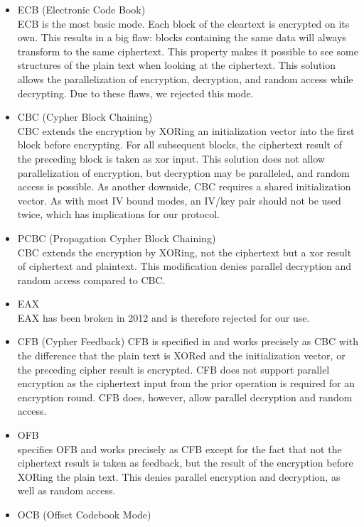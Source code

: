 \begin{itemize}
	\item ECB (Electronic Code Book)\\
	ECB is the most basic mode. Each block of the cleartext is encrypted on its own. This results in a big flaw: blocks containing the same data will always transform to the same ciphertext. This property makes it possible to see some structures of the plain text when looking at the ciphertext. This solution allows the parallelization of encryption, decryption, and random access while decrypting. Due to these flaws, we rejected this mode.
	\item CBC (Cypher Block Chaining)\\  
	CBC extends the encryption by XORing an initialization vector into the first block before encrypting. For all subsequent blocks, the ciphertext result of the preceding block is taken as xor input. This solution does not allow parallelization of encryption, but decryption may be paralleled, and random access is possible. As another downside, CBC requires a shared initialization vector. As with most IV bound modes, an IV/key pair should not be used twice, which has implications for our protocol.
	\item PCBC (Propagation Cypher Block Chaining)\\
	CBC extends the encryption by XORing, not the ciphertext but a xor result of ciphertext and plaintext. This modification denies parallel decryption and random access compared to CBC.
	\item EAX\\      
	EAX has been broken in 2012\cite{minematsu2013attacks} and is therefore rejected for our use.
	\item CFB (Cypher Feedback)
	CFB is specified in \cite{dworkin2001recommendation} and works precisely as CBC with the difference that the plain text is XORed and the initialization vector, or the preceding cipher result is encrypted. CFB does not support parallel encryption as the ciphertext input from the prior operation is required for an encryption round. CFB does, however, allow parallel decryption and random access.
	\item OFB\\
	\cite{dworkin2001recommendation} specifies OFB and works precisely as CFB except for the fact that not the ciphertext result is taken as feedback, but the result of the encryption before XORing the plain text. This denies parallel encryption and decryption, as well as random access.
	\item OCB (Offset Codebook Mode)\\

\end{itemize}
